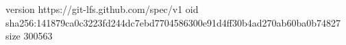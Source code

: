 version https://git-lfs.github.com/spec/v1
oid sha256:141879ca0c3223fd244dc7ebd7704586300e91d4ff30b4ad270ab60ba0b74827
size 300563
